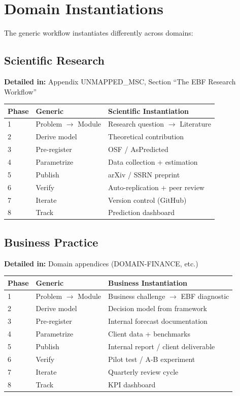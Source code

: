 \section{Domain Instantiations}
\label{sec:apply-domains}

The generic workflow instantiates differently across domains:

\subsection{Scientific Research}

\textbf{Detailed in:} Appendix UNMAPPED_MSC, Section ``The EBF Research Workflow''

\begin{center}
\small
\begin{tabular}{@{}lll@{}}
\toprule
\textbf{Phase} & \textbf{Generic} & \textbf{Scientific Instantiation} \\
\midrule
1 & Problem $\to$ Module & Research question $\to$ Literature \\
2 & Derive model & Theoretical contribution \\
3 & Pre-register & OSF / AsPredicted \\
4 & Parametrize & Data collection + estimation \\
5 & Publish & arXiv / SSRN preprint \\
6 & Verify & Auto-replication + peer review \\
7 & Iterate & Version control (GitHub) \\
8 & Track & Prediction dashboard \\
\bottomrule
\end{tabular}
\end{center}

\subsection{Business Practice}

\textbf{Detailed in:} Domain appendices (DOMAIN-FINANCE, etc.)

\begin{center}
\small
\begin{tabular}{@{}lll@{}}
\toprule
\textbf{Phase} & \textbf{Generic} & \textbf{Business Instantiation} \\
\midrule
1 & Problem $\to$ Module & Business challenge $\to$ EBF diagnostic \\
2 & Derive model & Decision model from framework \\
3 & Pre-register & Internal forecast documentation \\
4 & Parametrize & Client data + benchmarks \\
5 & Publish & Internal report / client deliverable \\
6 & Verify & Pilot test / A-B experiment \\
7 & Iterate & Quarterly review cycle \\
8 & Track & KPI dashboard \\
\bottomrule
\end{tabular}
\end{center}

